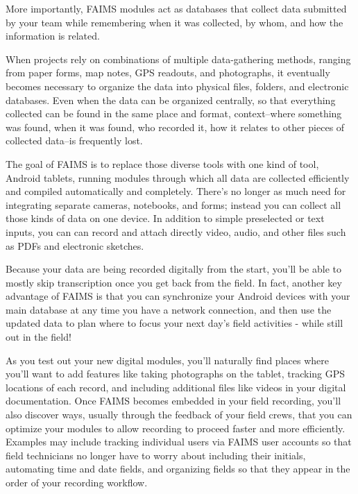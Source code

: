 More importantly, FAIMS modules act as databases that collect data submitted by your team while remembering when it was collected, by whom, and how the information is related.


When projects rely on combinations of multiple data-gathering methods, ranging from paper forms, map notes, GPS readouts, and photographs, it eventually becomes necessary to organize the data into physical files, folders, and electronic databases. Even when the data can be organized centrally, so that everything collected can be found in the same place and format, context--where something was found, when it was found, who recorded it, how it relates to other pieces of collected data--is frequently lost.

The goal of FAIMS is to replace those diverse tools with one kind of tool, Android tablets, running modules through which all data are collected efficiently and compiled automatically and completely. There's no longer as much need for integrating separate cameras, notebooks, and forms; instead you can collect all those kinds of data on one device. In addition to simple preselected or text inputs, you can can record and attach directly video, audio, and other files such as PDFs and electronic sketches.

Because your data are being recorded digitally from the start, you'll be able to mostly skip transcription once you get back from the field. In fact, another key advantage of FAIMS is that you can synchronize your Android devices with your main database at any time you have a network connection, and then use the updated data to plan where to focus your next day's field activities - while still out in the field!

As you test out your new digital modules, you'll naturally find places where you'll want to add features like taking photographs on the tablet, tracking GPS locations of each record, and including additional files like videos in your digital documentation. Once FAIMS becomes embedded in your field recording, you'll also discover ways, usually through the feedback of your field crews, that you can optimize your modules to allow recording to proceed faster and more efficiently. Examples may include tracking individual users via FAIMS user accounts so that field technicians no longer have to worry about including their initials, automating time and date fields, and organizing fields so that they appear in the order of your recording workflow.

